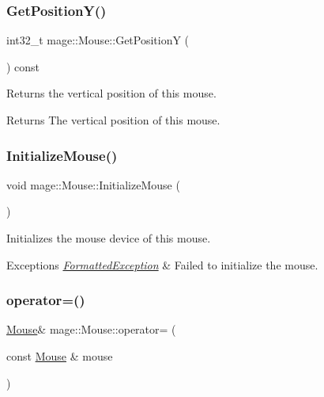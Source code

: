 \subsubsection{\texorpdfstring{Get\+Position\+Y()}{GetPositionY()}}
{\footnotesize\ttfamily int32\+\_\+t mage\+::\+Mouse\+::\+Get\+PositionY (\begin{DoxyParamCaption}{ }\end{DoxyParamCaption}) const}

Returns the vertical position of this mouse.

\begin{DoxyReturn}{Returns}
The vertical position of this mouse. 
\end{DoxyReturn}
\hypertarget{classmage_1_1_mouse_ac158b6d6fff5b05dea5ebefa86c0d56a}{}\label{classmage_1_1_mouse_ac158b6d6fff5b05dea5ebefa86c0d56a} 
\subsubsection{\texorpdfstring{Initialize\+Mouse()}{InitializeMouse()}}
{\footnotesize\ttfamily void mage\+::\+Mouse\+::\+Initialize\+Mouse (\begin{DoxyParamCaption}{ }\end{DoxyParamCaption})\hspace{0.3cm}{\ttfamily [private]}}

Initializes the mouse device of this mouse.


\begin{DoxyExceptions}{Exceptions}
{\em \hyperlink{structmage_1_1_formatted_exception}{Formatted\+Exception}} & Failed to initialize the mouse. \\
\hline
\end{DoxyExceptions}
\hypertarget{classmage_1_1_mouse_a585119f1b0db3fbc7436c86676518c8c}{}\label{classmage_1_1_mouse_a585119f1b0db3fbc7436c86676518c8c} 
\subsubsection{\texorpdfstring{operator=()}{operator=()}\hspace{0.1cm}{\footnotesize\ttfamily [1/2]}}
{\footnotesize\ttfamily \hyperlink{classmage_1_1_mouse}{Mouse}\& mage\+::\+Mouse\+::operator= (\begin{DoxyParamCaption}\item[{const \hyperlink{classmage_1_1_mouse}{Mouse} \&}]{mouse }\end{DoxyParamCaption})\hspace{0.3cm}{\ttfamily [delete]}}

